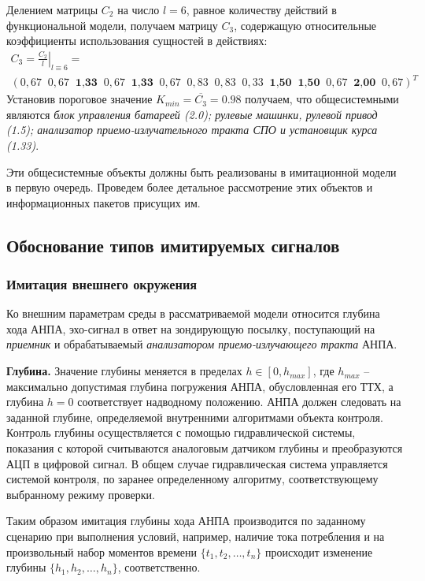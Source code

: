 Делением матрицы $C_2$ на число $l = 6$, равное количеству действий в функциональной модели, получаем матрицу $C_3$,
содержащую относительные коэффициенты использования сущностей в действиях:
\begin{multline}
    C_3 = \left. \frac{C_2}{l} \right|_{l \equiv 6} = \\
        \left( 0,67\;\; 0,67\;\; \textbf{1,33}\;\; 0,67\;\; \textbf{1,33}\;\; 0,67\;\; 0,83\;\; 0,83\;\; 
        0,33\;\; \textbf{1,50}\;\;\textbf{1,50}\;\; 0,67\;\; \textbf{2,00}\;\; 0,67 \right)^T
\end{multline}
Установив пороговое значение $K_{min} = \overline{C_3} = 0.98$ получаем, что общесистемными являются
\textit{блок управления батареей (2.0);
    рулевые машинки, рулевой привод (1.5);
    анализатор приемо-излучательного тракта СПО и установщик курса (1.33)}.

Эти общесистемные объекты должны быть реализованы в имитационной модели в первую очередь.
Проведем более детальное рассмотрение этих объектов и информационных пакетов присущих им.


\subsection{Обоснование типов имитируемых сигналов}\label{sec:model_anpa_params}

\subsubsection{Имитация внешнего окружения}\label{sec:model_anpa:outer_params}
Ко внешним параметрам среды в рассматриваемой модели относится
глубина хода АНПА, эхо-сигнал в ответ на зондирующую посылку,
поступающий на \textit{приемник} и обрабатываемый \textit{анализатором приемо-излучающего тракта} АНПА.

\textbf{Глубина.}
Значение глубины меняется в пределах $h \in [0, h_{max}]$,
где $h_{max}$ -- максимально допустимая глубина погружения АНПА, обусловленная его ТТХ,
а глубина $h = 0$ соответствует надводному положению.
АНПА должен следовать на заданной глубине, определяемой внутренними алгоритмами объекта контроля.
Контроль глубины осуществляется с помощью гидравлической системы,
показания с которой считываются аналоговым датчиком глубины и преобразуются АЦП в цифровой сигнал.
В общем случае гидравлическая система управляется системой контроля,
по заранее определенному алгоритму, соответствующему выбранному режиму проверки.

Таким образом имитация глубины хода АНПА производится по заданному сценарию
при выполнения условий, например, наличие тока потребления
и на произвольный набор моментов времени $\{t_1, t_2, \ldots, t_n\}$
происходит изменение глубины $\{h_1, h_2, \ldots, h_n\}$, соответственно.


